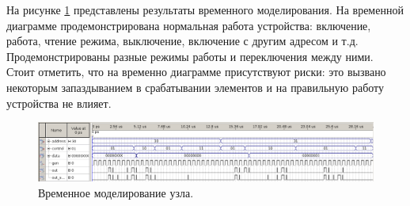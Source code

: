 На рисунке \ref{fig:timemodel} представлены результаты временного моделирования. На временной диаграмме продемонстрирована нормальная работа устройства: включение, работа, чтение режима, выключение, включение с другим адресом и т.д. Продемонстрированы разные режимы работы и переключения между ними. \\
Стоит отметить, что на временно диаграмме присутствуют риски: это вызвано некоторым запаздыванием в срабатывании элементов и на правильную работу устройства не влияет.
\begin{figure}
  \includegraphics[scale=0.50]{./timing-two-modes.png}
  \caption{Временное моделирование узла.}
  \label{fig:timemodel}
\end{figure}